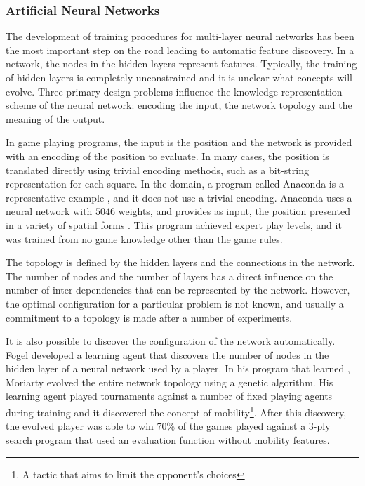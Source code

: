 \subsubsection{Artificial Neural Networks}
\label{sec:networks}


The development of training procedures for multi-layer neural networks has been the most important step on the road leading to automatic feature discovery.  In a network, the nodes in the hidden layers represent features.  Typically, the training of hidden layers is completely unconstrained and it is unclear what concepts will evolve.  Three primary design problems influence the knowledge representation scheme of the neural network: encoding the input, the network topology and the meaning of the output.   

In game playing programs, the input is the position and the network is provided with an encoding of the position to evaluate. In many cases, the position is translated directly using trivial encoding methods, such as a bit-string representation for each square. In the  domain, a program called Anaconda is a representative example \cite{chellapilla:defeats, chellapilla:without}, and it does not use a trivial encoding.  Anaconda uses a neural network with $5046$ weights, and provides as input, the position presented in a variety of spatial forms \cite{davis:evolve}. This program achieved expert play levels, and it was trained from no game knowledge other than the game rules.

The topology is defined by the hidden layers and the connections in the network.  The number of nodes and the number of layers has a direct influence on the number of inter-dependencies that can be represented by the network. However, the optimal configuration for a particular problem is not known, and usually a commitment to a topology is made after a number of experiments. 

It is also possible to discover the configuration of the network automatically. Fogel \cite{fogel:networks} developed a learning agent that discovers the number of nodes in the hidden layer of a neural network used by a  player. In his program that learned , Moriarty  \cite{moriarty:evolving} evolved the entire network topology using a genetic algorithm. His learning agent played tournaments against a number of fixed playing agents during training and it discovered the concept of mobility\footnote{A tactic that aims to limit the opponent's choices}.  After this discovery, the evolved player was able to win 70\% of the games played against a 3-ply search program that used an evaluation function without mobility features.   

